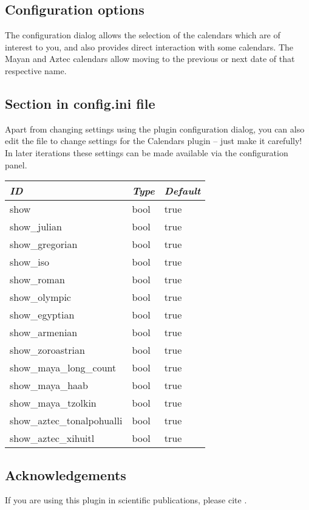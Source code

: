 \subsection{Configuration options}
\label{sec:plugin:Calendars:configuration}

The configuration dialog allows the selection of the calendars which are
of interest to you, and also provides direct interaction with some calendars.
The Mayan and Aztec calendars allow moving to the previous or next date of that respective name. 

\subsection*{Section  in config.ini file}

Apart from changing settings using the plugin configuration dialog,
you can also edit the  file to change
settings for the Calendars plugin -- just make it carefully! In later iterations these settings can be made available via the configuration panel.

\begin{longtable}{l|l|l}\toprule
\emph{ID}                      &\emph{Type} & \emph{Default}  \\\midrule
show                         &bool & true\\\midrule
show\_julian                 &bool & true\\
show\_gregorian              &bool & true\\
show\_iso                    &bool & true\\\midrule
show\_roman                  &bool & true\\
show\_olympic                &bool & true\\
show\_egyptian               &bool & true\\
show\_armenian               &bool & true\\
show\_zoroastrian            &bool & true\\\midrule
show\_maya\_long\_count      &bool & true\\
show\_maya\_haab             &bool & true\\
show\_maya\_tzolkin          &bool & true\\
show\_aztec\_tonalpohualli   &bool & true\\
show\_aztec\_xihuitl         &bool & true\\\bottomrule
\end{longtable}

\subsection{Acknowledgements}

If you are using this plugin in scientific publications, please cite \citet{Zotti-etal:JSA2020.6.2}.




